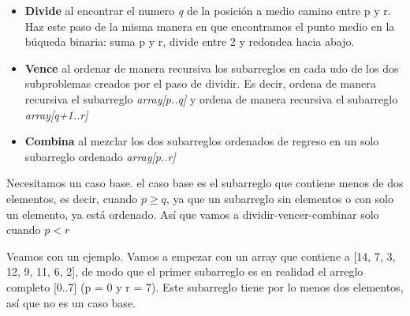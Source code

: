 \documentclass[letterpaper, 12pt]{article}
\begin{document}
  \begin{itemize}
    \item \textbf{Divide} al encontrar el numero \textit{q} de la posición a medio camino entre p y r. Haz este paso de la misma
    manera en que encontramos el punto medio en la búqueda binaria: suma p y r, divide entre 2 y redondea hacia abajo.
    \item \textbf{Vence} al ordenar de manera recursiva los subarreglos en cada udo de los dos subproblemas creados por el paso 
    de dividir. Es decir, ordena de manera recursiva el subarreglo \textit{array[p..q]} y ordena de manera recursiva el subarreglo \textit{array[q+1..r]}
    \item \textbf{Combina} al mezclar los dos subarreglos ordenados de regreso en un solo subarreglo ordenado \textit{array[p..r]}
  \end{itemize}

  Necesitamos un caso base. el caso base es el subarreglo que contiene menos de dos elementos, es decir, cuando $p \geq q$, ya que un subarreglo sin 
  elementos o con solo un elemento, ya está ordenado. Así que vamos a dividir-vencer-combinar solo cuando $p < r$

  Veamos con un ejemplo. Vamos a empezar con un array que contiene a [14, 7, 3, 12, 9, 11, 6, 2], de modo que el primer subarreglo es en 
  realidad el arreglo completo [0..7] (p = 0 y r = 7). Este subarreglo tiene por lo menos dos elementos, así que no es un caso base.
\end{document}
